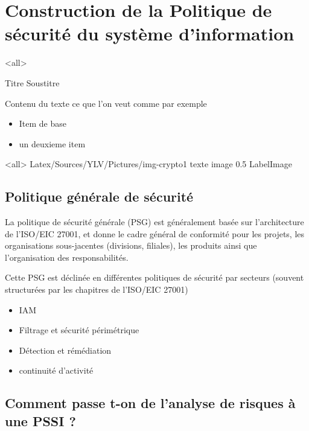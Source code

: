 

\section{Construction de la Politique de sécurité du système d'information}

\mode<all>{\texframe
{Titre} %
{Soustitre} %
{
	Contenu du texte ce que l'on veut comme par exemple
 \begin{itemize}
    \item Item de base
    \item un deuxieme item
 \end{itemize}
}}


\mode<all>{\picframe
{Latex/Sources/YLV/Pictures/img-crypto1}%
{texte image} %
{0.5} %
{LabelImage} %
}


\subsection{Politique générale de sécurité}

La politique de sécurité générale (PSG) est généralement basée sur l'architecture de l'ISO/EIC 27001, et donne le cadre général de conformité pour les projets, les organisations sous-jacentes (divisions, filiales), les produits ainsi que l'organisation des responsabilités.

Cette PSG est déclinée en différentes politiques de sécurité par secteurs (souvent structurées par les chapitres de l'ISO/EIC 27001)

\begin{itemize}
	\item IAM
	\item Filtrage et sécurité périmétrique
	\item Détection et rémédiation
	\item continuité d'activité
\end{itemize}
	

\subsection{Comment passe t-on de l’analyse de risques à une PSSI ?}

